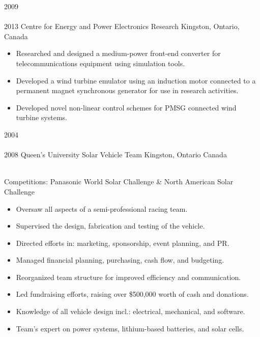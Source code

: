 \begin{entrylist}
{}
\entry
  {2009\\\faChevronDown\\2013}
  {Centre for Energy and Power Electronics Research}
  {Kingston, Ontario, Canada}
  {
  \begin{itemize}
    \item Researched and designed a medium-power front-end converter for telecommunications equipment using simulation tools.
    \item Developed a wind turbine emulator using an induction motor connected to a permanent magnet synchronous generator for use in research activities.
    \item Developed novel non-linear control schemes for PMSG connected wind turbine systems.
  \end{itemize}}
\entry
  {2004\\\faChevronDown\\2008}
  {Queen's University Solar Vehicle Team}
  {Kingston, Ontario Canada}
  {\\
  Competitions: {\bodyfontit Panasonic World Solar Challenge} \&
  {\bodyfontit North American Solar Challenge}\\
  \begin{itemize}
    \item Oversaw all aspects of a semi-professional racing team.
    \item Supervised the design, fabrication and testing of the vehicle.
    \item Directed efforts in: marketing, sponsorship, event planning, and PR.
    \item Managed financial planning, purchasing, cash flow, and budgeting.
  \end{itemize}
  \begin{itemize}
    \item Reorganized team structure for improved efficiency and communication.
    \item Led fundraising efforts, raising over \$500,000 worth of cash and donations.
    \item Knowledge of all vehicle design incl.: electrical, mechanical, and software.
    \item Team’s expert on power systems, lithium-based batteries, and solar cells.
  \end{itemize}
}
\end{entrylist}